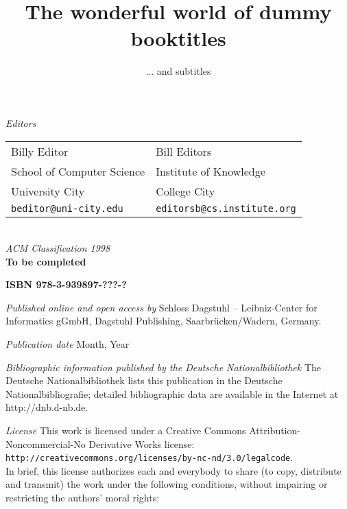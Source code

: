 \documentclass[a4paper,UKenglish]{dfumaster}
\title{The wonderful world of dummy booktitles}
\subtitle{... and subtitles}
\begin{document}
\frontmatter

\maketitle

\begin{publicationinfo}%
\sffamily

\emph{Editors} \\[0.2cm]
\begin{tabular}{ll}
Billy Editor              &   Bill Editors   \\
School of Computer Science   &  Institute of Knowledge \\ 
University City & College City \\ 
\texttt{beditor@uni-city.edu} &  \texttt{editorsb@cs.institute.org}
\end{tabular}
\ \\

\bigskip
\bigskip
\bigskip
\bigskip
\emph{ACM Classification 1998}\\
\textbf{To be completed}

\bigskip
\bigskip

{\Large\bf\sffamily ISBN 978-3-939897-???-?}

\bigskip
\bigskip

\emph{Published online and open access by}\newline
Schloss Dagstuhl -- Leibniz-Center for Informatics gGmbH, Dagstuhl Publishing, Saarbrücken/Wadern, Germany.

\bigskip
\emph{Publication date}\newline
Month, Year

\bigskip
\bigskip

\emph{Bibliographic information published by the Deutsche Nationalbibliothek}\newline
The Deutsche Nationalbibliothek lists this publication in the Deutsche Nationalbibliografie; detailed bibliographic data are available in the Internet at http://dnb.d-nb.de.

\bigskip

\emph{License}\newline
This work is licensed under  a Creative Commons Attribution-Noncommercial-No Derivative Works license: \texttt{http://creativecommons.org/licenses/by-nc-nd/3.0/legalcode}.\\
In brief, this license authorizes each and everybody to share (to copy, distribute and transmit) the work under the following conditions, without impairing or restricting the authors’ moral rights:


\end{publicationinfo}
\end{document}

